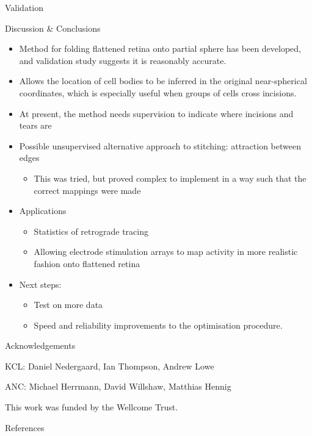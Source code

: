 \documentclass[final,hyperref={pdfpagelabels=false}]{beamer}
\begin{document}
\begin{frame}{}
\begin{columns}[T]
\begin{column}{.33\linewidth}
\begin{block}{Validation}
      \end{block}

      \begin{block}{Discussion \& Conclusions}
        \begin{itemize}
        \item Method for folding flattened retina onto partial sphere has
          been developed, and validation study suggests it is
          reasonably accurate.
        \item Allows the location of cell bodies to be inferred in
          the original near-spherical coordinates, which is especially
          useful when groups of cells cross incisions.
        \item At present, the method needs supervision to indicate
          where incisions and tears are
        \item Possible unsupervised alternative approach to stitching:
          attraction between edges
          \begin{itemize}
          \item This was tried, but proved complex to implement in a
            way such that the correct mappings were made
          \end{itemize}
        \item Applications
          \begin{itemize}
          \item Statistics of retrograde tracing
          \item Allowing electrode stimulation arrays to map activity
            in more realistic fashion onto flattened retina
          \end{itemize}
        \item Next steps:
          \begin{itemize}
          \item Test on more data
          \item Speed and reliability improvements to the optimisation
            procedure.
          \end{itemize}
        \end{itemize}
      \end{block}

      \begin{block}{Acknowledgements}

        KCL: Daniel Nedergaard, Ian Thompson, Andrew Lowe

        ANC: Michael Herrmann, David Willshaw, Matthias Hennig

        This work was funded by the Wellcome Trust.
      \end{block}


      \begin{block}{References}
        \footnotesize
        
        
      \end{block}
    \end{column}


  \end{columns}



\end{frame}
\end{document}

